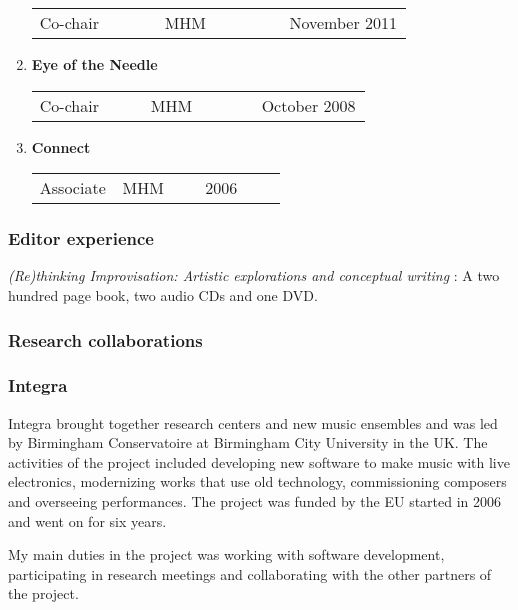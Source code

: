 \begin{enumerate}
  \begin{tabular}[c]{p{0.33\linewidth} p{0.33\linewidth} p{0.33\linewidth}}
    Co-chair & MHM & November 2011    
  \end{tabular}

\item \textbf{Eye of the Needle}

  \begin{tabular}[c]{p{0.33\linewidth} p{0.33\linewidth} p{0.33\linewidth}}
    Co-chair & MHM & October 2008
  \end{tabular}
\item \textbf{Connect}

  \begin{tabular}[c]{p{0.33\linewidth} p{0.33\linewidth} p{0.33\linewidth}}
    Associate & MHM & 2006    
  \end{tabular}

\end{enumerate}

\subsubsection*{\textsf{Editor experience}}

\emph{(Re)thinking Improvisation: Artistic explorations and conceptual writing} \citep{frisk-re_improv13}: A two hundred page book, two audio CDs and one DVD.

\subsubsection*{\textsf{Research collaborations}}

\subsubsection*{\textsf{Integra}}

Integra brought together research centers and new music ensembles and was led by Birmingham Conservatoire at Birmingham City University in the UK. The activities of the project included developing new software to make music with live electronics, modernizing works that use old technology, commissioning composers and overseeing performances. The project was funded by the EU started in 2006 and went on for six years. 

My main duties in the project was working with software development, participating in research meetings and collaborating with the other partners of the project.

